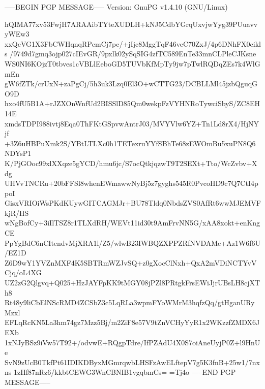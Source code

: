 -----BEGIN PGP MESSAGE-----
Version: GnuPG v1.4.10 (GNU/Linux)

hQIMA77xv53FwjH7ARAAibTYteXUDLH+kNJ5CdbYGrqUxvjwYyg39PUuavvyWEw3
xxQcVG1X3FbCWHqnqRPcmCj7pc/+jIjc8MggTqF46veC70ZxJ/4p6DNhFX0cikls
/9749d7gmq3ojp027cIEvGR/9pxlk02ySqSIG4zfTC589EnTe33mnCLPleCJKsne
WS0NI6KOjzT0tbves1cVBLlEeboGD5TUVbKfMpTy9jw7pTwlRQDqZEs7k4WlGmEn
gW6fZTk/crUxN+zaPgCj/5h3uk3Lzq0El3O+wCTTG23/DCBLLMl45jzbQguqGO9D
hxo4fU5B1A+rJZXOnWnfUd2BISSlD85Qm0wekpFzVYHNRoTywciSbyS/ZC8EH14E
xmdsTDPI988ivtj8Eqa0ThFKtGSpvwAntrJ03/MVYVlw6YZ+Tn1Ld8rX4/HjNYjf
+3Z6uHBPuXmk2S/YBtLTLXc0h1TETexruYYfSBhTe68zEWOmBu5xuPN8Q6NDYsP1
K/PjGOoc99xlXXqze5gYCD/hmu6jc/S7ocQtkjqzwT9T2SEXt+Tto/WcZvbv+Xdg
UHVvTNCRu+20bFFSl8whenEWmawwNyBj5z7gyghs545R0PvcoHD9c7Q7CtI4ppoI
GisxVRIOiWsPKdKUywGITCAGMJr+BU78Tldq0NbdsZVS0AfRt6wwMJEMVFkjR/HS
wNgBofCy+3iIlTSZ8r1TLXdRH/WEVt11id30t9AmFrvNN5G/xAA8xokt+enKngCE
PpYgBdC6nCItendvMjXRA1l/Z5/wlwB23IWBQZXPPZRfNVDAMc+Az1W6f6U/EZ1D
Z6D9wY1YVZnMXF4K5SBTRmWZJvSQ+z0gXocClNxh+QxA2mVDiNCTYvVCjq/oL4XG
UZ2zG2Qlgvq+Q025+HzJAYFpKK9tMGY08jPZl8PRtgkFrsEWiJjrUBsLH8cjXTh8
Rt48y9liCbElNScRMD4ZCSbZ3c5LqRLa3wpmFYoWMrM3hqfzQq/gtHganURyMzxl
EFLqRcKN5La3hm74gz7Mzz5Bj/m2ZiF8e57V9tZnVCHyYyR1x2WKzzfZMDX6JEXb
1xNJyBSz9iVw57T92+/odvwE+RQgpTdre/IfPZAdU4X0S7oiAneUyjP0Z+l9HnUe
SvN9zUcB0TkfPt61IDIKDByxMGmrqwbLHSFzAwELftepV7g5K3fnB+25w1/7nxns
1zHf87nRz6/kkbtCEWG3WnCBNIB1vgqbmCs=
=Tj4o
-----END PGP MESSAGE-----
